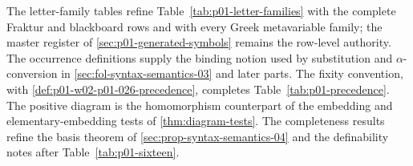 The letter-family tables refine Table~\ref{tab:p01-letter-families} with the
complete Fraktur and blackboard rows and with every Greek metavariable
family; the master register of \cref{sec:p01-generated-symbols} remains the
row-level authority.  The occurrence definitions supply the binding notion
used by substitution and \(\alpha\)-conversion in
\cref{sec:fol-syntax-semantics-03} and later parts.  The fixity convention,
with \cref{def:p01-w02-p01-026-precedence}, completes
Table~\ref{tab:p01-precedence}.  The positive diagram is the
homomorphism counterpart of the embedding and elementary-embedding tests of
\cref{thm:diagram-tests}.  The completeness results refine the basis theorem
of \cref{sec:prop-syntax-semantics-04} and the definability notes after
Table~\ref{tab:p01-sixteen}.
